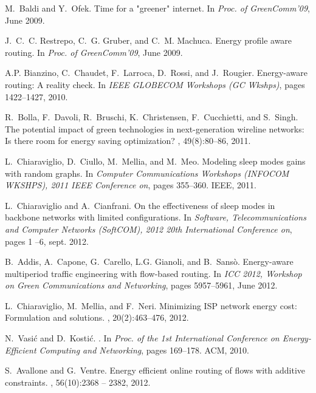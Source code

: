 \documentclass[final,5p,times,twocolumn]{elsarticle}
\begin{document}
\begin{thebibliography}{10}
M.~Baldi and Y.~Ofek.
\newblock Time for a "greener" internet.
\newblock In {\em Proc. of GreenComm'09}, June 2009.

J.~C.~C. Restrepo, C.~G. Gruber, and C.~M. Machuca.
\newblock Energy profile aware routing.
\newblock In {\em Proc. of GreenComm'09}, June 2009.

A.P. Bianzino, C.~Chaudet, F.~Larroca, D.~Rossi, and J.~Rougier.
\newblock Energy-aware routing: A reality check.
\newblock In {\em IEEE GLOBECOM Workshops (GC Wkshps)}, pages 1422--1427, 2010.

R.~Bolla, F.~Davoli, R.~Bruschi, K.~Christensen, F.~Cucchietti, and S.~Singh.
\newblock The potential impact of green technologies in next-generation
  wireline networks: Is there room for energy saving optimization?
, 49(8):80--86, 2011.

L.~Chiaraviglio, D.~Ciullo, M.~Mellia, and M.~Meo.
\newblock Modeling sleep modes gains with random graphs.
\newblock In {\em Computer Communications Workshops (INFOCOM WKSHPS), 2011 IEEE
  Conference on}, pages 355--360. IEEE, 2011.

L.~Chiaraviglio and A.~Cianfrani.
\newblock On the effectiveness of sleep modes in backbone networks with limited
  configurations.
\newblock In {\em Software, Telecommunications and Computer Networks (SoftCOM),
  2012 20th International Conference on}, pages 1 --6, sept. 2012.

B.~Addis, A.~Capone, G.~Carello, L.G. Gianoli, and B.~Sans\`o.
\newblock Energy-aware multiperiod traffic engineering with flow-based routing.
\newblock In {\em ICC 2012, Workshop on Green Communications and Networking},
  pages 5957--5961, June 2012.

L.~Chiaraviglio, M.~Mellia, and F.~Neri.
\newblock Minimizing {ISP} network energy cost: Formulation and solutions.
, 20(2):463--476,
  2012.

N.~Vasi{\'c} and D.~Kosti{\'c}.
.
\newblock In {\em Proc. of the 1st International Conference on Energy-Efficient
  Computing and Networking}, pages 169--178. ACM, 2010.

S.~Avallone and G.~Ventre.
\newblock Energy efficient online routing of flows with additive constraints.
, 56(10):2368 -- 2382, 2012.


\end{thebibliography}
\end{document}
